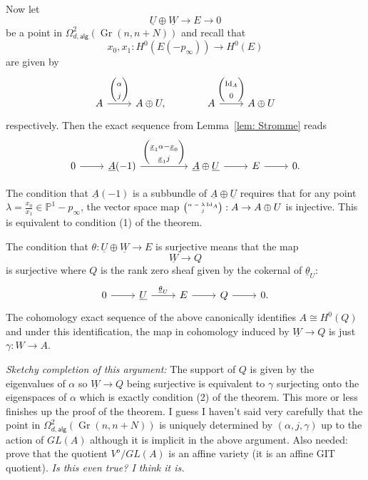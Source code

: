\documentclass{amsart}
\theoremstyle{definition}
\newcommand{\PP}{\mathbb{P}}
\newcommand{\UL}[1]{\underline{#1}}
\newcommand{\alg}{\mathsf{alg}}
\newcommand{\Gr}{\operatorname{Gr}}
\newcommand{\LoopTwo}{\Omega^{2}_{d,\alg}}
\newcommand{\Id}{\operatorname{Id}}
\begin{document}
Now let 
\[
\UL{U} \oplus \UL{W} \to E \to 0
\]
be a point in $\LoopTwo (\Gr (n,n+N))$ and recall that 
\[
x_{0},x_{1}: H^{0}(E(-p_{\infty})) \to H^{0}(E)
\]
are given by
\[
\begin{tikzcd}
A \arrow{r}{\begin{pmatrix} \alpha \\ j  \end{pmatrix}} &A\oplus U,
\quad & A \arrow{r}{\begin{pmatrix} \Id_{A} \\ 0  \end{pmatrix}} &A\oplus U
\end{tikzcd}
\]
respectively. Then the exact sequence from Lemma~\ref{lem: Stromme}
reads
\[
\begin{tikzcd}
0 \arrow[r] &\UL{A}(-1) \arrow{rr}{\begin{pmatrix} \UL{x}_{1}\alpha -\UL{x}_{0}\\
\UL{x}_{1}j  \end{pmatrix}}&&\UL{A}\oplus \UL{U}\arrow[r]&E
\arrow[r]& 0.
\end{tikzcd}
\]

The condition that $\UL{A}(-1)$ is a subbundle of $\UL{A}\oplus
\UL{U}$ requires that for any point $\lambda =\frac{x_{0}}{x_{1}}\in
\PP^{1}-p_{\infty}$, the vector space map ${\tiny \begin{pmatrix} \alpha -\lambda \Id_{A}\\
j \end{pmatrix}} : A\to A\oplus U $ is injective. This is equivalent
to condition (1) of the theorem.

The condition that $\theta :\UL{U}\oplus \UL{W} \to E$ is surjective
means that the map 
\[
\UL{W} \to Q
\]
is surjective where $Q$ is the rank zero sheaf given by the cokernal
of $\UL{\theta}_{U}$:
\[
\begin{tikzcd}
0\arrow[r]& \UL{U} \arrow{r}{\UL{\theta}_{U}} & E\arrow[r]&Q\arrow[r]&0.
\end{tikzcd}
\]
The cohomology exact sequence of the above canonically identifies
$A\cong H^{0}(Q)$ and under this identification, the map in cohomology
induced by $\UL{W}\to Q$ is just $\gamma :W\to A$.

\emph{Sketchy completion of this argument:}  The support of $Q$ is
given by the eigenvalues of $\alpha$ so $\UL{W}\to Q$ being surjective
is equivalent to $\gamma$ surjecting onto the eigenspaces of $\alpha$
which is exactly condition (2) of the theorem. This more or less finishes up the
proof of the theorem. I guess I haven't said very carefully that the
point in $\LoopTwo (\Gr (n,n+N))$ is uniquely determined by $(\alpha
,j,\gamma )$ up to the action of $GL(A)$ although it is implicit in
the above argument. Also needed: prove that the quotient $V^{o}/GL(A)$
is an affine variety (it is an affine GIT  quotient). \emph{Is this
even true? I think it is.}
\end{document}
